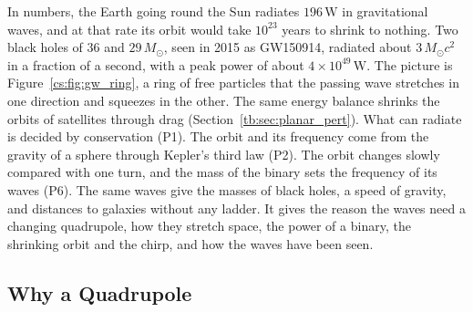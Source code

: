 In numbers, the Earth going round the Sun radiates $196\,\mathrm W$ in gravitational waves, and at that rate its orbit would take $10^{23}$ years to shrink to nothing. Two black holes of $36$ and $29\,M_\odot$, seen in 2015 as GW150914, radiated about $3\,M_\odot c^2$ in a fraction of a second, with a peak power of about $4\times10^{49}\,\mathrm W$. The picture is Figure~\ref{cs:fig:gw_ring}, a ring of free particles that the passing wave stretches in one direction and squeezes in the other. The same energy balance shrinks the orbits of satellites through drag (Section~\ref{tb:sec:planar_pert}). What can radiate is decided by conservation (P1). The orbit and its frequency come from the gravity of a sphere through Kepler's third law (P2). The orbit changes slowly compared with one turn, and the mass of the binary sets the frequency of its waves (P6). The same waves give the masses of black holes, a speed of gravity, and distances to galaxies without any ladder. It gives the reason the waves need a changing quadrupole, how they stretch space, the power of a binary, the shrinking orbit and the chirp, and how the waves have been seen.

\subsection{Why a Quadrupole}

